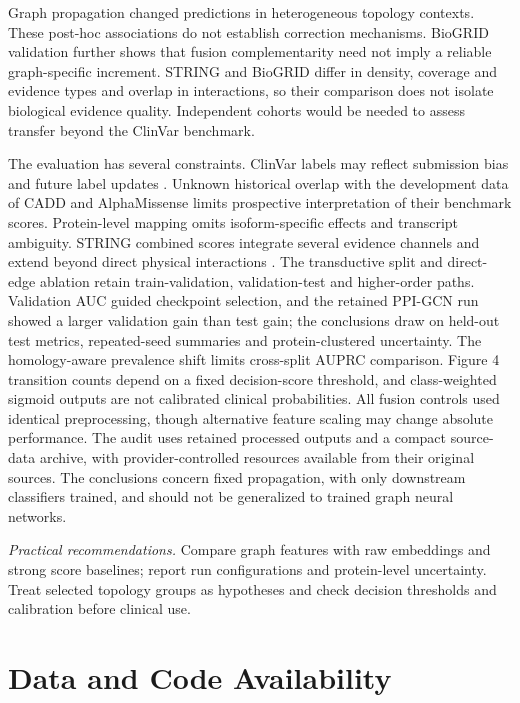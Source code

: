 \documentclass[conference]{IEEEtran}
\begin{document}
Graph propagation changed predictions in heterogeneous topology contexts. These post-hoc associations do not establish correction mechanisms. BioGRID validation further shows that fusion complementarity need not imply a reliable graph-specific increment. STRING and BioGRID differ in density, coverage and evidence types and overlap in interactions, so their comparison does not isolate biological evidence quality. Independent cohorts would be needed to assess transfer beyond the ClinVar benchmark.

The evaluation has several constraints. ClinVar labels may reflect submission bias and future label updates \cite{Landrum2020ClinVar}. Unknown historical overlap with the development data of CADD and AlphaMissense limits prospective interpretation of their benchmark scores. Protein-level mapping omits isoform-specific effects and transcript ambiguity. STRING combined scores integrate several evidence channels and extend beyond direct physical interactions \cite{Szklarczyk2023STRING}. The transductive split and direct-edge ablation retain train-validation, validation-test and higher-order paths. Validation AUC guided checkpoint selection, and the retained PPI-GCN run showed a larger validation gain than test gain; the conclusions draw on held-out test metrics, repeated-seed summaries and protein-clustered uncertainty. The homology-aware prevalence shift limits cross-split AUPRC comparison. Figure 4 transition counts depend on a fixed decision-score threshold, and class-weighted sigmoid outputs are not calibrated clinical probabilities. All fusion controls used identical preprocessing, though alternative feature scaling may change absolute performance. The audit uses retained processed outputs and a compact source-data archive, with provider-controlled resources available from their original sources. The conclusions concern fixed propagation, with only downstream classifiers trained, and should not be generalized to trained graph neural networks.

\noindent\textit{Practical recommendations.} Compare graph features with raw embeddings and strong score baselines; report run configurations and protein-level uncertainty. Treat selected topology groups as hypotheses and check decision thresholds and calibration before clinical use.

\section*{Data and Code Availability}
\end{document}
